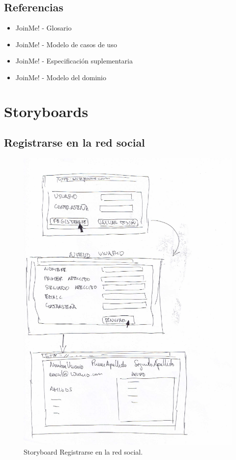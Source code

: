 \documentclass[12pt, a4paper, titlepage]{article}
\begin{document}
\subsection{Referencias}

\begin{itemize}

    \item JoinMe! - Glosario
    \item JoinMe! - Modelo de casos de uso
    \item JoinMe! - Especificación suplementaria
    \item JoinMe! - Modelo del dominio
\end{itemize}

\newpage
\section{Storyboards}

\subsection{Registrarse en la red social}

\begin{figure}[h]
	\begin{center}
		\includegraphics[scale=0.6]{Imagenes/registrarse}
		\caption{Storyboard Registrarse en la red social.}
	\end{center}
\end{figure}
\end{document}
